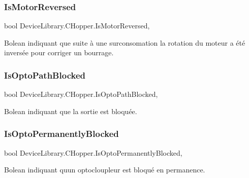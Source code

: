 \subsubsection{\texorpdfstring{Is\+Motor\+Reversed}{IsMotorReversed}}
{\footnotesize\ttfamily bool Device\+Library.\+C\+Hopper.\+Is\+Motor\+Reversed\hspace{0.3cm}{\ttfamily [get]}, {\ttfamily [set]}}



Bolean indiquant que suite à une surconsomation la rotation du moteur a été inversée pour corriger un bourrage. 

\mbox{\label{class_device_library_1_1_c_hopper_aba941b8ab4317792660483f287171363}} 
\subsubsection{\texorpdfstring{Is\+Opto\+Path\+Blocked}{IsOptoPathBlocked}}
{\footnotesize\ttfamily bool Device\+Library.\+C\+Hopper.\+Is\+Opto\+Path\+Blocked\hspace{0.3cm}{\ttfamily [get]}, {\ttfamily [set]}}



Bolean indiquant que la sortie est bloquée. 

\mbox{\label{class_device_library_1_1_c_hopper_ad7168dd39fa5f937164d357c3236321d}} 
\subsubsection{\texorpdfstring{Is\+Opto\+Permanently\+Blocked}{IsOptoPermanentlyBlocked}}
{\footnotesize\ttfamily bool Device\+Library.\+C\+Hopper.\+Is\+Opto\+Permanently\+Blocked\hspace{0.3cm}{\ttfamily [get]}, {\ttfamily [set]}}



Bolean indiquant qu\textquotesingle{}un optocloupleur est bloqué en permanence. 

